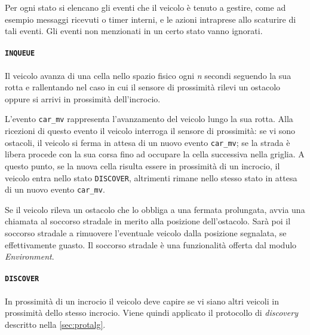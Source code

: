 \documentclass{memoir}
\begin{document}
Per ogni stato si elencano gli eventi che il veicolo è tenuto a gestire, come ad
esempio messaggi ricevuti o timer interni, e le azioni intraprese allo scaturire
di tali eventi. Gli eventi non menzionati in un certo stato vanno ignorati.

\paragraph{\texttt{INQUEUE}}
Il veicolo avanza di una cella nello spazio fisico ogni \emph{n} secondi
seguendo la sua rotta e rallentando nel caso in cui il sensore di prossimità
rilevi un ostacolo oppure si arrivi in prossimità dell'incrocio.

\begin{figure}[h]
  \centering
\end{figure}

L'evento \texttt{car\_mv} rappresenta l'avanzamento del veicolo lungo la sua
rotta. Alla ricezioni di questo evento il veicolo interroga il sensore di
prossimità: se vi sono ostacoli, il veicolo si ferma in attesa di un nuovo
evento \texttt{car\_mv}; se la strada è libera procede con la sua corsa fino ad
occupare la cella successiva nella griglia. A questo punto, se la nuova cella
risulta essere in prossimità di un incrocio, il veicolo entra nello stato
\texttt{DISCOVER}, altrimenti rimane nello stesso stato in attesa di un nuovo
evento \texttt{car\_mv}.

Se il veicolo rileva un ostacolo che lo obbliga a una fermata prolungata, avvia
una chiamata al soccorso stradale in merito alla posizione dell'ostacolo. Sarà
poi il soccorso stradale a rimuovere l'eventuale veicolo dalla posizione
segnalata, se effettivamente guasto. Il soccorso stradale è una funzionalità
offerta dal modulo \emph{Environment}.

\paragraph{\texttt{DISCOVER}}
In prossimità di un incrocio il veicolo deve capire se vi siano altri veicoli in
prossimità dello stesso incrocio. Viene quindi applicato il protocollo di
\emph{discovery} descritto nella \cref{sec:protalg}.
\end{document}
